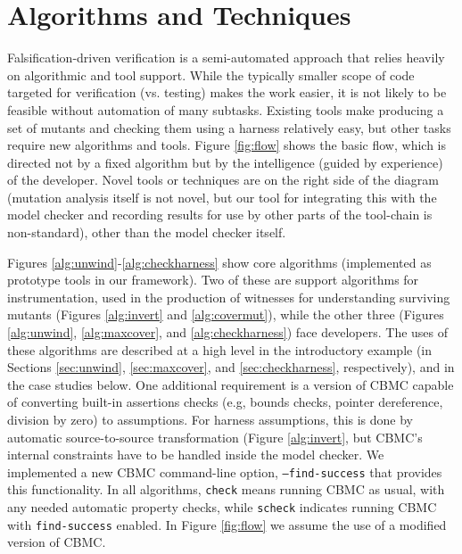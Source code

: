 \documentclass[conference]{IEEEtran}
\begin{document}
\section{Algorithms and Techniques}
\label{sec:algs}

Falsification-driven verification is a semi-automated approach that
relies heavily on algorithmic and tool support.  While the typically
smaller scope of code targeted for verification (vs. testing) makes the work easier,
it is not likely to be feasible without automation of many
subtasks. Existing tools make producing a set of mutants and checking
them using a harness relatively easy, but other tasks require new algorithms
and tools.  Figure \ref{fig:flow} shows the basic flow, which is directed
not by a fixed algorithm but by the intelligence (guided by experience)
\cite{NeroWolfe} of the
developer.  Novel tools or techniques are on the right side of the
diagram (mutation analysis itself is not novel, but our tool for integrating
this with the model checker and recording results for use by other
parts of the tool-chain is non-standard), other than the model checker
itself. 

Figures \ref{alg:unwind}-\ref{alg:checkharness} show core algorithms
(implemented as prototype tools in our framework).  Two of these are
support algorithms for instrumentation, used in the production of
witnesses for understanding surviving mutants (Figures
\ref{alg:invert} and \ref{alg:covermut}), while the other three
(Figures \ref{alg:unwind}, \ref{alg:maxcover}, and
\ref{alg:checkharness}) face developers.  The uses of these algorithms
are described at a high level in the introductory example (in Sections
\ref{sec:unwind}, \ref{sec:maxcover}, and \ref{sec:checkharness},
respectively), and in the case studies below.   One additional requirement is a version of CBMC capable of converting built-in
assertions checks (e.g, bounds checks, pointer dereference, division by
zero) to assumptions.  For harness assumptions, this is done by
automatic source-to-source transformation (Figure \ref{alg:invert}, but CBMC's
internal constraints have to be handled inside the model checker.  We
implemented a new CBMC command-line option, {\tt --find-success} that
provides this functionality.  In all algorithms, {\tt check} means
running CBMC as usual, with any needed automatic property
checks, while {\tt scheck} indicates running CBMC with
{\tt find-success} enabled.  In Figure \ref{fig:flow} we assume the
use of a modified version of CBMC.
\end{document}
